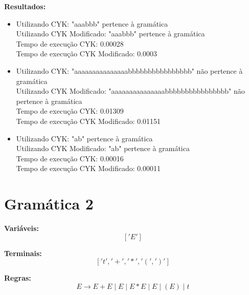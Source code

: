 \documentclass[a4paper,12pt]{article} %
\begin{document}
\textbf{Resultados:}
\begin{itemize}
    \item Utilizando CYK: "aaabbb" pertence à gramática \\
    Utilizando CYK Modificado: "aaabbb" pertence à gramática \\
    Tempo de execução CYK: 0.00028 \\
    Tempo de execução CYK Modificado: 0.0003 \\
    
    \item Utilizando CYK: "aaaaaaaaaaaaaaabbbbbbbbbbbbbbbb" não pertence à gramática \\
    Utilizando CYK Modificado: "aaaaaaaaaaaaaaabbbbbbbbbbbbbbbb" não pertence à gramática \\
    Tempo de execução CYK: 0.01309 \\
    Tempo de execução CYK Modificado: 0.01151 \\
    
    \item Utilizando CYK: "ab" pertence à gramática \\
    Utilizando CYK Modificado: "ab" pertence à gramática \\
    Tempo de execução CYK: 0.00016 \\
    Tempo de execução CYK Modificado: 0.00011 \\
\end{itemize}

\section*{Gramática 2}
\textbf{Variáveis:}
\[
['E']
\]

\textbf{Terminais:}
\[
['t', '+', '*', '(', ')']
\]

\textbf{Regras:}
\[
E \to E + E \mid E \mid E * E \mid E \mid ( E ) \mid t
\]
\end{document}
